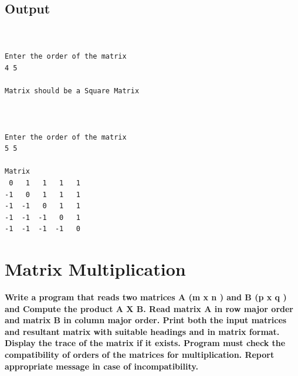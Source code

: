 \documentclass[a4paper]{report}
\begin{document}
\section*{Output}
\begin{Verbatim}


Enter the order of the matrix
4 5

Matrix should be a Square Matrix



Enter the order of the matrix
5 5

Matrix 
 0	 1	 1	 1	 1	
-1	 0	 1	 1	 1	
-1	-1	 0	 1	 1	
-1	-1	-1	 0	 1	
-1	-1	-1	-1	 0	
\end{Verbatim}

\chapter{Matrix Multiplication}
{\selectfont \textbf{Write a program that reads two matrices A (m x n ) and B (p x q ) and Compute the product A X  B. Read matrix A in row major order and matrix B in column major order. Print both the input matrices and resultant matrix with suitable headings and in matrix format. Display the trace of the matrix if it exists. Program must check the compatibility of orders of the matrices for multiplication. Report appropriate message in case of incompatibility. 
}}
\end{document}
